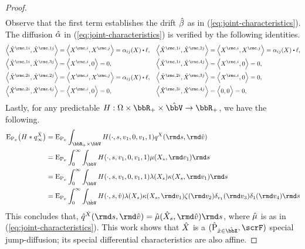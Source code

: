 \begin{proof}
\begin{align*}
  \end{align*}
  Observe that the first term establishes the drift $\hat{\beta}$ as in (\ref{eq:joint-characteristics}).
  The diffusion $\hat{\alpha}$ in (\ref{eq:joint-characteristics}) is verified by the following identities.
  \begin{align*}
    \Bprj{\hat\X^{\rmc,1i}}{\hat\X^{\rmc,1j}} &= \Bprj{\X^{\rmc,i}}{\X^{\rmc,j}} = \affDiff_{ij}(\X) \shortInt \leb, &
    \Bprj{\hat\X^{\rmc,1i}}{\hat\X^{\rmc,2j}} &= \Bprj{\X^{\rmc,i}}{\X^{\rmc,j}} = \affDiff_{ij}(\X) \shortInt \leb, \\
    \Bprj{\hat\X^{\rmc,1i}}{\hat\X^{\rmc,3j}} &= \Bprj{\X^{\rmc,i}}{0} = 0, &
    \Bprj{\hat\X^{\rmc,1i}}{\hat\X^{\rmc,4j}} &= \Bprj{\X^{\rmc,i}}{0} = 0, \\
    \Bprj{\hat\X^{\rmc,2i}}{\hat\X^{\rmc,2j}} &= \Bprj{\X^{\rmc,i}}{\X^{\rmc,j}} = \affDiff_{ij}(\X) \shortInt \leb, &
    \Bprj{\hat\X^{\rmc,2i}}{\hat\X^{\rmc,3j}} &= \Bprj{\X^{\rmc,i}}{0} = 0,  \\
    \Bprj{\hat\X^{\rmc,2i}}{\hat\X^{\rmc,4j}} &= \Bprj{\X^{\rmc,i}}{0} = 0, &
    \Bprj{\hat\X^{\rmc,3i}}{\hat\X^{\rmc,4j}} &= \Bprj{0}{0} = 0, 
  \end{align*}
  Lastly, for any predictable $H: \Omega \times \bbR_+ \times \hat\vecSpace \rightarrow \bbR_+$, we have the following.
  \begin{align*}
    \Exp_{\Prb_\stateVar} \big( H \ast \jumpMeas^{\hat\X}_\infty \big)
    &= \Exp_{\Prb_\stateVar} \int_{\bbR_+\times\vecSpace} H(\cdot, s, \markVar_1, 0, \markVar_1, 1) \jumpMeas^\X(\rmd s, \rmd\hat\markVar) \\
    &= \Exp_{\Prb_\stateVar} \int_0^\infty \int_\vecSpace H(\cdot, s, \markVar_1, 0, \markVar_1, 1) \affJump(\X_s, \rmd\markVar_1) \rmd s \\
    &= \Exp_{\Prb_\stateVar} \int_0^\infty \int_\vecSpace H(\cdot, s, \markVar_1, 0, \markVar_1, 1) \affInt(\X_s) \affDist(\X_s, \rmd\markVar_1)  \rmd s \\
    &= \Exp_{\Prb_\stateVar} \int_0^\infty \int_{\hat\vecSpace} H(\cdot, s, \hat\markVar) \affInt(\X_s) \affDist(\X_s, \rmd\markVar_1) \zeta(\rmd\markVar_2) \delta_{\markVar_1}(\rmd\markVar_3) \delta_1(\rmd\markVar_4)  \rmd s
  \end{align*}
  This concludes that, $\predproj{\jumpMeas^{\hat\X}}(\rmd s, \rmd\hat\markVar) = \hat\affJump(\hat\X_s, \rmd\hat\markVar) \rmd s$, where $\hat{\mu}$ is as in (\ref{eq:joint-characteristics}).
  This work shows that $\hat{X}$ is a $(\hat\Prb_{\hat\stateVar\in\hat\stateSpace}, \scrF)$ special jump-diffusion; its special differential characteristics are also affine.

\end{proof}
